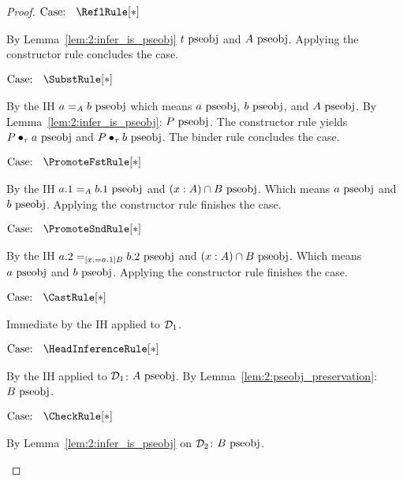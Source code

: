 \begin{proof}
    $\text{Case: }\begin{array}{c} \ReflRule[*] \end{array}$
    \begin{proofcase}
        By Lemma~\ref{lem:2:infer_is_pseobj} $t~\mbox{\normalfont pseobj}$ and $A~\mbox{\normalfont pseobj}$.
        Applying the constructor rule concludes the case.
    \end{proofcase}

    $\text{Case: }\begin{array}{c} \SubstRule[*] \end{array}$
    \begin{proofcase}
        By the IH $a =_A b~\mbox{\normalfont pseobj}$ which means $a~\mbox{\normalfont pseobj}$, $b~\mbox{\normalfont pseobj}$, and $A~\mbox{\normalfont pseobj}$.
        By Lemma~\ref{lem:2:infer_is_pseobj}: $P~\mbox{\normalfont pseobj}$.
        The constructor rule yields $P \bullet_{\tau} a~\mbox{\normalfont pseobj}$ and $P \bullet_{\tau} b~\mbox{\normalfont pseobj}$.
        The binder rule concludes the case.
    \end{proofcase}

    $\text{Case: }\begin{array}{c} \PromoteFstRule[*] \end{array}$
    \begin{proofcase}
        By the IH $a.1 =_A b.1~\mbox{\normalfont pseobj}$ and $(x : A) \cap B~\mbox{\normalfont pseobj}$. Which means $a~\mbox{\normalfont pseobj}$ and $b~\mbox{\normalfont pseobj}$.
        Applying the constructor rule finishes the case.
    \end{proofcase}

    $\text{Case: }\begin{array}{c} \PromoteSndRule[*] \end{array}$
    \begin{proofcase}
        By the IH $a.2 =_{[x := a.1]B} b.2~\mbox{\normalfont pseobj}$ and $(x : A) \cap B~\mbox{\normalfont pseobj}$. Which means $a~\mbox{\normalfont pseobj}$ and $b~\mbox{\normalfont pseobj}$.
        Applying the constructor rule finishes the case.
    \end{proofcase}

    $\text{Case: }\begin{array}{c} \CastRule[*] \end{array}$
    \begin{proofcase}
        Immediate by the IH applied to $\mathcal{D}_{1}$.
    \end{proofcase}

    $\text{Case: }\begin{array}{c} \HeadInferenceRule[*] \end{array}$
    \begin{proofcase}
        By the IH applied to $\mathcal{D}_{1}$: $A~\mbox{\normalfont pseobj}$.
        By Lemma~\ref{lem:2:pseobj_preservation}: $B~\mbox{\normalfont pseobj}$.
    \end{proofcase}

    $\text{Case: }\begin{array}{c} \CheckRule[*] \end{array}$
    \begin{proofcase}
        By Lemma~\ref{lem:2:infer_is_pseobj} on $\mathcal{D}_{2}$: $B~\mbox{\normalfont pseobj}$.
    \end{proofcase}
\end{proof}

